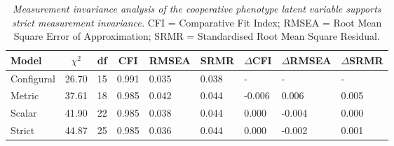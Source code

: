 \documentclass[
  man,floatsintext]{apa6}
\begin{document}
\newpage






\begin{table}[H]

\begin{center}
\begin{threeparttable}

\caption{\label{tab:tableCompareMI}\emph{Measurement invariance analysis of the cooperative
phenotype latent variable supports strict measurement invariance.} CFI =
Comparative Fit Index; RMSEA = Root Mean Square Error of Approximation; SRMR =
Standardised Root Mean Square Residual.}

\begin{tabular}{lllllllll}
\toprule
Model & \multicolumn{1}{c}{$\chi^2$} & \multicolumn{1}{c}{df} & \multicolumn{1}{c}{CFI} & \multicolumn{1}{c}{RMSEA} & \multicolumn{1}{c}{SRMR} & \multicolumn{1}{c}{$\Delta$CFI} & \multicolumn{1}{c}{$\Delta$RMSEA} & \multicolumn{1}{c}{$\Delta$SRMR}\\
\midrule
Configural & 26.70 & 15 & 0.991 & 0.035 & 0.038 & - & - & -\\
Metric & 37.61 & 18 & 0.985 & 0.042 & 0.044 & -0.006 & 0.006 & 0.005\\
Scalar & 41.90 & 22 & 0.985 & 0.038 & 0.044 & 0.000 & -0.004 & 0.000\\
Strict & 44.87 & 25 & 0.985 & 0.036 & 0.044 & 0.000 & -0.002 & 0.001\\
\bottomrule
\end{tabular}

\end{threeparttable}
\end{center}

\end{table}
\end{document}
